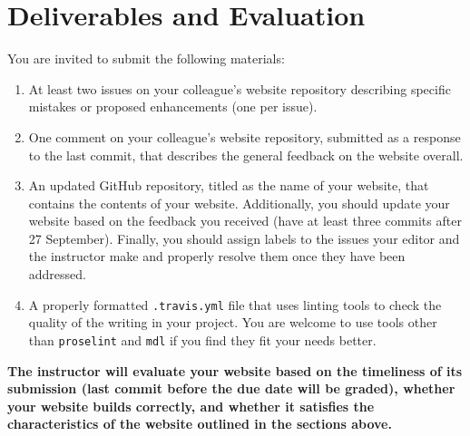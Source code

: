 \documentclass[11pt]{article}
\begin{document}
\section*{Deliverables and Evaluation}

You are invited to submit the following materials:
\begin{enumerate}
	\item At least two issues on your colleague's website repository describing specific mistakes or proposed enhancements (one per issue). 
	\item One comment on your colleague's website repository, submitted as a response to the last commit, that describes the general feedback on the website overall. 
	\item An updated GitHub repository, titled as the name of your website, that contains the contents of your website. Additionally, you should update your website based on the feedback you received (have at least three commits after 27 September). Finally, you should assign labels to the issues your editor and the instructor make and properly resolve them once they have been addressed. 
	\item A properly formatted {\tt .travis.yml} file that uses linting tools to check the quality of the writing in your project. You are welcome to use tools other than {\tt proselint} and {\tt mdl} if you find they fit your needs better. 
\end{enumerate}

\textbf{The instructor will evaluate your website based on the timeliness of its submission (last commit before the due date will be graded), whether your website builds correctly, and whether it satisfies the characteristics of the website outlined in the sections above.}
\end{document}

